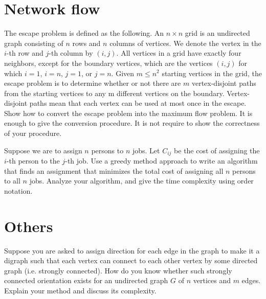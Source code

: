 \begin{refsection}
\section{Network flow}
\begin{Exercise}
The escape problem is defined as the following. An $n \times n$ grid is an undirected graph consisting of $n$ rows and $n$ columns of vertices. We denote the vertex in the $i$-th row and $j$-th column by $(i, j)$. All vertices in a grid have exactly four neighbors, except for the boundary vertices, which are the vertices $(i, j)$ for which $i = 1$, $i = n$, $j = 1$, or $j = n$. Given $m \leq n^2$ starting vertices in the grid, the escape problem is to determine whether or not there are $m$ vertex-disjoint paths from the starting vertices to any m different vertices on the boundary. Vertex-disjoint paths mean that each vertex can be used at most once in the escape. Show how to convert the escape problem into the maximum flow problem. It is enough to give the conversion procedure. It is not require to show the correctness of your procedure. 
\end{Exercise}
\begin{Answer}
\end{Answer}

\begin{Exercise}
Suppose we are to assign $n$ persons to $n$ jobs. Let $C_{ij}$ be the cost of assigning the $i$-th person to the $j$-th job. Use a greedy method approach to write an algorithm that finds an assignment that minimizes the total cost of assigning all $n$ persons to all $n$ jobs. Analyze your algorithm, and give the time complexity using order notation. 
\end{Exercise}
\begin{Answer}
\end{Answer}

\section{Others}
\begin{Exercise}
Suppose you are asked to assign direction for each edge in the graph to make it a digraph such that each vertex can connect to each other vertex by some directed graph (i.e. strongly connected). How do you know whether such strongly connected orientation exists for an undirected graph $G$ of $n$ vertices and $m$ edges. Explain your method and discuss its complexity. \school{[NCKU IM 99]}
\end{Exercise}
\begin{Answer}
\end{Answer}


\end{refsection}
